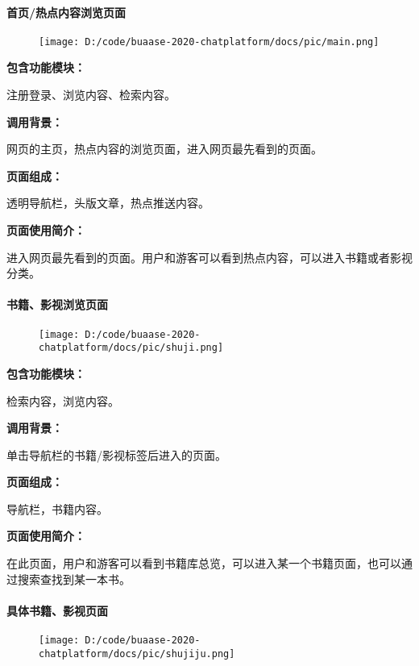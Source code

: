 \documentclass[
]{article}
\begin{document}
\hypertarget{header-n1291}{%
\paragraph{首页/热点内容浏览页面}\label{header-n1291}}

\begin{figure}
\centering
\texttt{[image: D:/code/buaase-2020-chatplatform/docs/pic/main.png]}
\caption{}
\end{figure}

\textbf{包含功能模块：}

注册登录、浏览内容、检索内容。

\textbf{调用背景：}

网页的主页，热点内容的浏览页面，进入网页最先看到的页面。

\textbf{页面组成：}

透明导航栏，头版文章，热点推送内容。

\textbf{页面使用简介：}

进入网页最先看到的页面。用户和游客可以看到热点内容，可以进入书籍或者影视分类。

\hypertarget{header-n1301}{%
\paragraph{书籍、影视浏览页面}\label{header-n1301}}

\begin{figure}
\centering
\texttt{[image: D:/code/buaase-2020-chatplatform/docs/pic/shuji.png]}
\caption{}
\end{figure}

\textbf{包含功能模块：}

检索内容，浏览内容。

\textbf{调用背景：}

单击导航栏的书籍/影视标签后进入的页面。

\textbf{页面组成：}

导航栏，书籍内容。

\textbf{页面使用简介：}

在此页面，用户和游客可以看到书籍库总览，可以进入某一个书籍页面，也可以通过搜索查找到某一本书。

\hypertarget{header-n1311}{%
\paragraph{具体书籍、影视页面}\label{header-n1311}}

\begin{figure}
\centering
\texttt{[image: D:/code/buaase-2020-chatplatform/docs/pic/shujiju.png]}
\caption{}
\end{figure}
\end{document}
